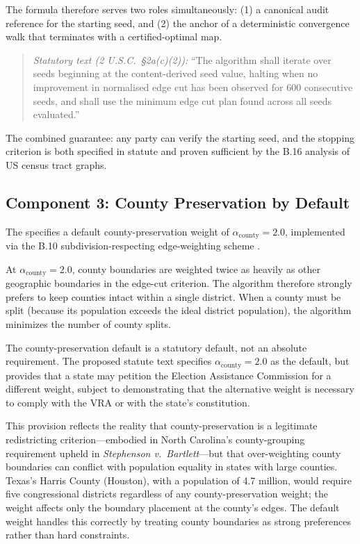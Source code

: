 The formula therefore serves two roles simultaneously:
(1) a canonical audit reference for the starting seed, and
(2) the anchor of a deterministic convergence walk that terminates with
a certified-optimal map.
\begin{quote}
\textit{Statutory text (2 U.S.C.\ §2a(c)(2)):}
``The algorithm shall iterate over seeds beginning at the content-derived
seed value, halting when no improvement in normalised edge cut has been
observed for 600 consecutive seeds, and shall use the minimum edge cut
plan found across all seeds evaluated.''
\end{quote}
\noindent The combined guarantee: any party can verify the starting seed,
and the stopping criterion is both specified in statute and proven sufficient
by the B.16 analysis of US census tract graphs.

\subsection{Component 3: County Preservation by Default}

The \dia{} specifies a default county-preservation weight of $\alpha_\text{county} = 2.0$,
implemented via the B.10 subdivision-respecting edge-weighting scheme \citep{b10paper}.

At $\alpha_\text{county} = 2.0$, county boundaries are weighted twice as
heavily as other geographic boundaries in the edge-cut criterion.
The algorithm therefore strongly prefers to keep counties intact within a
single district.
When a county must be split (because its population exceeds the ideal district
population), the algorithm minimizes the number of county splits.

The county-preservation default is a statutory default, not an absolute
requirement.
The proposed statute text specifies $\alpha_\text{county} = 2.0$ as the
default, but provides that a state may petition the Election Assistance
Commission for a different weight, subject to demonstrating that the
alternative weight is necessary to comply with the VRA or with the
state's constitution.

This provision reflects the reality that county-preservation is a legitimate
redistricting criterion---embodied in North Carolina's county-grouping
requirement upheld in \textit{Stephenson v.\ Bartlett}---but that
over-weighting county boundaries can conflict with population equality
in states with large counties.
Texas's Harris County (Houston), with a population of 4.7 million, would
require five congressional districts regardless of any county-preservation
weight; the weight affects only the boundary placement at the county's
edges.
The default weight handles this correctly by treating county boundaries as
strong preferences rather than hard constraints.

